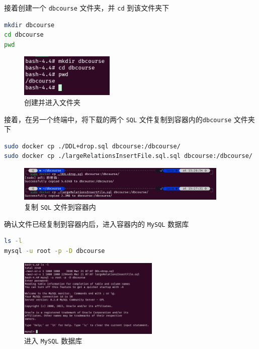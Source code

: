 \documentclass{article}
\begin{document}
接着创建一个 \texttt{dbcourse} 文件夹，并 \texttt{cd} 到该文件夹下

\begin{lstlisting}[language=bash]
mkdir dbcourse
cd dbcourse
pwd
\end{lstlisting}

\begin{figure}[H]
\centering
\includegraphics[width=0.4\textwidth]{img/2.png}
\caption{创建并进入文件夹}
\end{figure}

接着，在另一个终端中，将下载的两个 \texttt{SQL} 文件复制到容器内的\texttt{dbcourse} 文件夹下

\begin{lstlisting}[language=bash]
sudo docker cp ./DDL+drop.sql dbcourse:/dbcourse/
sudo docker cp ./largeRelationsInsertFile.sql.sql dbcourse:/dbcourse/
\end{lstlisting}

\begin{figure}[H]
\centering
\includegraphics[width=0.9\textwidth]{img/3.png}
\caption{复制 \texttt{SQL} 文件到容器内}
\end{figure}

确认文件已经复制到容器内后，进入容器内的 \texttt{MySQL} 数据库

\begin{lstlisting}[language=bash]
ls -l
mysql -u root -p -D dbcourse
\end{lstlisting}

\begin{figure}[H]
\centering
\includegraphics[width=0.6\textwidth]{img/4.png}
\caption{进入 \texttt{MySQL} 数据库}
\end{figure}
\end{document}
